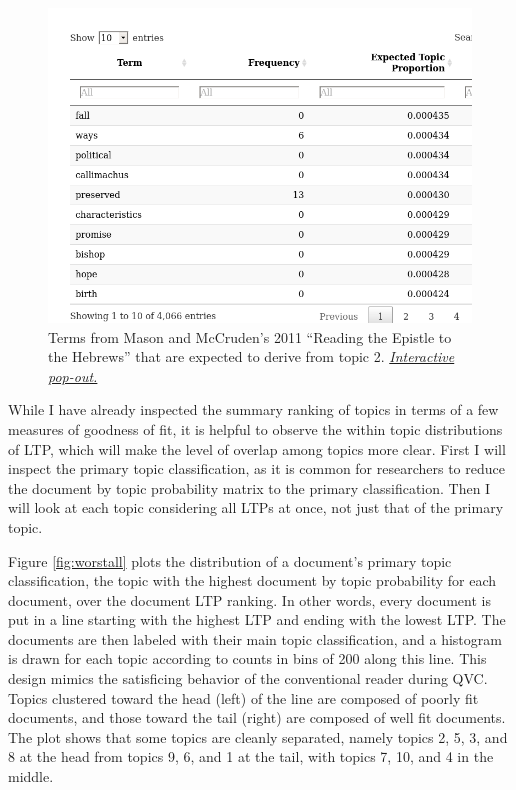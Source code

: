 \documentclass[]{book}
\theoremstyle{definition}
\theoremstyle{definition}
\theoremstyle{definition}
\theoremstyle{remark}
\begin{document}
\begin{figure}

{\centering \includegraphics[width=0.9\linewidth]{03_files/figure-latex/worstterms-1} 

}

\caption{Terms from Mason and McCruden's 2011 ``Reading the
Epistle to the Hebrews'' that are expected to derive from topic 2.
\href{https://brooksambrose.github.io/portfolio/exh/worstterms.html}{\emph{Interactive
pop-out.}}}\label{fig:worstterms}
\end{figure}

While I have already inspected the summary ranking of topics in terms of
a few measures of goodness of fit, it is helpful to observe the within
topic distributions of LTP, which will make the level of overlap among
topics more clear. First I will inspect the primary topic
classification, as it is common for researchers to reduce the document
by topic probability matrix to the primary classification. Then I will
look at each topic considering all LTPs at once, not just that of the
primary topic.

Figure \ref{fig:worstall} plots the distribution of a document's primary
topic classification, the topic with the highest document by topic
probability for each document, over the document LTP ranking. In other
words, every document is put in a line starting with the highest LTP and
ending with the lowest LTP. The documents are then labeled with their
main topic classification, and a histogram is drawn for each topic
according to counts in bins of 200 along this line. This design mimics
the satisficing behavior of the conventional reader during QVC. Topics
clustered toward the head (left) of the line are composed of poorly fit
documents, and those toward the tail (right) are composed of well fit
documents. The plot shows that some topics are cleanly separated, namely
topics 2, 5, 3, and 8 at the head from topics 9, 6, and 1 at the tail,
with topics 7, 10, and 4 in the middle.
\end{document}
